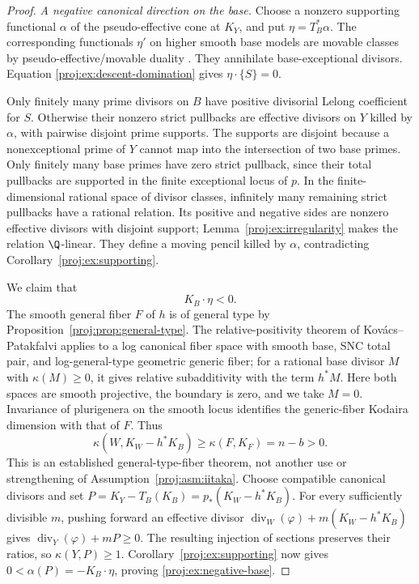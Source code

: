 \begin{proof}
\smallskip
\noindent\emph{A negative canonical direction on the base.}
Choose a nonzero supporting functional \(\alpha\) of the
pseudo-effective cone at \(K_Y\), and put
\(\eta=T_B^*\alpha\). The corresponding functionals \(\eta'\)
on higher smooth base models are movable classes by
pseudo-effective/movable duality \cite[Theorem~0.2]{BDPP}.
They annihilate base-exceptional divisors. Equation
\eqref{proj:ex:descent-domination} gives \(\eta\cdot\{S\}=0\).

Only finitely many prime divisors on \(B\) have positive
divisorial Lelong coefficient for \(S\). Otherwise their
nonzero strict pullbacks are effective divisors on \(Y\)
killed by \(\alpha\), with pairwise disjoint prime supports.
The supports are disjoint because a nonexceptional prime of
\(Y\) cannot map into the intersection of two base primes.
Only finitely many base primes have zero strict pullback,
since their total pullbacks are supported in the finite
exceptional locus of \(p\). In the finite-dimensional rational
space of divisor classes, infinitely many remaining strict
pullbacks have a rational relation. Its positive and negative
sides are nonzero effective divisors with disjoint support;
Lemma~\ref{proj:ex:irregularity} makes the relation
\(\Q\)-linear. They define a moving pencil killed by
\(\alpha\), contradicting Corollary~\ref{proj:ex:supporting}.

We claim that
\begin{equation}\label{proj:ex:negative-base}
 K_B\cdot\eta<0.
\end{equation}
The smooth general fiber \(F\) of \(h\) is of general type by
Proposition~\ref{proj:prop:general-type}. The relative-positivity
theorem of Kov\'acs--Patakfalvi
\cite[Theorem~9.9]{Proj-KovacsPatakfalvi2017} applies to a log
canonical fiber space with smooth base, SNC total pair, and
log-general-type geometric generic fiber; for a rational base
divisor \(M\) with \(\kappa(M)\geq0\), it gives relative
subadditivity with the term \(h^*M\). Here both spaces are
smooth projective, the boundary is zero, and we take \(M=0\).
Invariance of plurigenera on the smooth locus identifies the
generic-fiber Kodaira dimension with that of \(F\). Thus
\begin{equation}\label{proj:ex:relative-positive}
 \kappa(W,K_W-h^*K_B)\geq \kappa(F,K_F)=n-b>0.
\end{equation}
This is an established general-type-fiber theorem, not another
use or strengthening of Assumption~\ref{proj:asm:iitaka}.
Choose compatible canonical divisors and set
\(P=K_Y-T_B(K_B)=p_*(K_W-h^*K_B)\).
For every sufficiently divisible \(m\), pushing forward an
effective divisor
\(\operatorname{div}_W(\varphi)+m(K_W-h^*K_B)\)
gives
\(\operatorname{div}_Y(\varphi)+mP\geq0\).
The resulting injection of sections preserves their ratios,
so \(\kappa(Y,P)\geq1\). Corollary~\ref{proj:ex:supporting} now gives
\(0<\alpha(P)=-K_B\cdot\eta\), proving
\eqref{proj:ex:negative-base}.


\end{proof}
